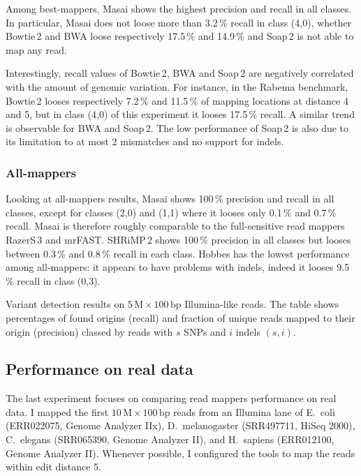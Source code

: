 Among best-mappers, Masai shows the highest precision and recall in all classes.
In particular, Masai does not loose more than 3.2\,\% recall in class (4,0), whether Bowtie\,2 and BWA loose respectively 17.5\,\% and 14.9\,\% and Soap\,2 is not able to map any read.

Interestingly, recall values of Bowtie\,2, BWA and Soap\,2 are negatively correlated with the amount of genomic variation.
For instance, in the Rabema benchmark, Bowtie\,2 looses respectively 7.2\,\% and 11.5\,\% of mapping locations at distance 4 and 5, but in class (4,0) of this experiment it looses 17.5\,\% recall.
A similar trend is observable for BWA and Soap\,2.
The low performance of Soap\,2 is also due to its limitation to at most 2 mismatches and no support for indels.

\subsubsection{All-mappers}

Looking at all-mappers results, Masai shows 100\,\% precision and recall in all classes, except for classes (2,0) and (1,1) where it looses only 0.1\,\% and 0.7\,\% recall.
Masai is therefore roughly comparable to the full-sensitive read mappers RazerS\,3 and mrFAST.
SHRiMP\,2 shows 100\,\% precision in all classes but looses between 0.3\,\% and 0.8\,\% recall in each class.
Hobbes has the lowest performance among all-mappers: it appears to have problems with indels, indeed it looses 9.5\,\% recall in class (0,3).

\begin{table*}[tH!]
  \caption[Masai variant detection results]
  {
  \label{tab:Variant}
    Variant detection results on $5\,\text{M}\times 100\,\text{bp}$ Illumina-like reads.
    The table shows percentages of found origins (recall) and fraction of unique reads mapped to their origin (precision) classed by reads with $s$ SNPs and $i$ indels $(s,i)$.
  }
  \vspace{-3mm}
  \center
  \sffamily
  \resizebox{0.8\textwidth}{!}
  {
	\renewcommand{\tabcolsep}{0.8ex}
	
  }
\end{table*}

\subsection{Performance on real data}

The last experiment focuses on comparing read mappers performance on real data.
I mapped the first $10\,\text{M}\times 100\,\text{bp}$ reads from an Illumina lane of E.~coli (ERR022075, Genome Analyzer IIx), D.~melanogaster (SRR497711, HiSeq 2000), C.~elegans (SRR065390, Genome Analyzer II), and H.~sapiens (ERR012100, Genome Analyzer II).
Whenever possible, I configured the tools to map the reads within edit distance 5.

